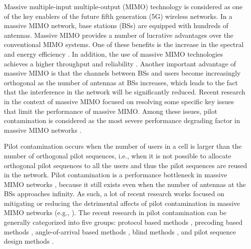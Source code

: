 \documentclass[conference]{IEEEtran}
\begin{document}
Massive multiple-input multiple-output (MIMO) technology is considered as one of the key enablers of the future fifth generation (5G) wireless networks. In a massive MIMO network, base stations (BSs) are equipped with hundreds of antennas. Massive MIMO provides a number of lucrative advantages over the conventional MIMO systems. One of these benefits is the increase in the spectral and energy efficiency \cite{Boccardi2014}. In addition, the use of massive MIMO technologies achieves a higher throughput and reliability \cite{Yang2015}. Another important advantage of massive MIMO is that the channels between BSs and users become increasingly orthogonal \cite{Akbar16} as the number of antennas at BSs increases, which leads to the fact that the interference in the network will be significantly reduced. Recent research in the context of massive MIMO focused on resolving some specific key issues that limit the performance of massive MIMO. Among these issues, pilot contamination is considered as the most severe performance degrading factor in massive MIMO networks \cite{Akbar16}.

Pilot contamination occurs when the number of users in a cell is larger than the number of orthogonal pilot sequences, i.e., when it is not possible to allocate orthogonal pilot sequences to all the users and thus the pilot sequences are reused in the network. Pilot contamination is a performance bottleneck in massive MIMO networks \cite{Marzetta2010,Larsson2014,Ashikhmin2012}, because it still exists even when the number of antennas at the BSs approaches infinity. As such, a lot of recent research works focused on mitigating or reducing the detrimental affects of pilot contamination in massive MIMO networks (e.g., \cite{Fernandes2013,Jose2011,Yin2013,Muller2014,Akbar16,Akbar16a}). The recent research in pilot contamination can be generally categorized into five groups: protocol based methods \cite{Fernandes2013}, precoding based methods \cite{Jose2011}, angle-of-arrival based methods \cite{Akbar16b}, blind methods \cite{Muller2014}, and pilot sequence design methods \cite{Akbar16,Akbar16a,Ulukus2001,Cotae2006,Viswanath1999}.
\end{document}
